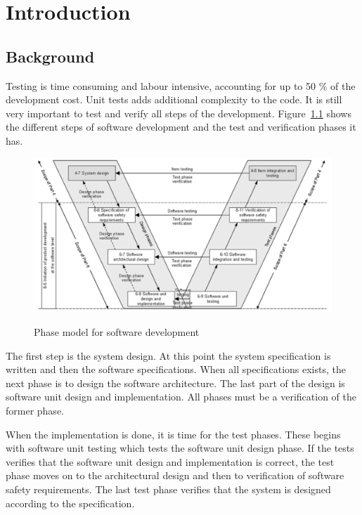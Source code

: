 \documentclass[11pt,a4paper]{report}
\begin{document}

\tableofcontents
\chapter{Introduction}

\section{Background}
Testing is time consuming and labour intensive, accounting for up to 50 \% of
the development cost\cite{QUICKCHECK:lightweight}. Unit tests adds additional
complexity to the code. It is still very important to test and verify all steps
of the development. Figure~\ref{IMG:phase_model} shows the different steps of
software development and the test and verification phases it has.

\begin{figure}[!ht]
  \includegraphics[keepaspectratio, width=\linewidth]{pictures/V}
  \label{IMG:phase_model}
  \caption{Phase model for software development}
\end{figure}

The first step is the system design. At this point the system specification is
written and then the software specifications. When all
specifications exists, the next phase is to design the software architecture.
The last part of the design is software unit design and implementation. All
phases must be a verification of the former phase.

When the implementation is done, it is time for the test phases. These begins
with software unit testing which tests the software unit design phase. If the
tests verifies that the software unit design and implementation is correct, the
test phase moves on to the architectural design and then to verification of
software safety requirements.
The last test phase verifies that the system is
designed according to the specification. %
\end{document}
